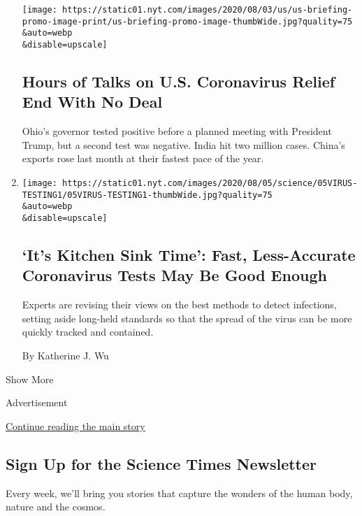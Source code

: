 \begin{enumerate}
  \texttt{[image: https://static01.nyt.com/images/2020/08/03/us/us-briefing-promo-image-print/us-briefing-promo-image-thumbWide.jpg?quality=75\\\&auto=webp\\\&disable=upscale]}

  \hypertarget{hours-of-talks-on-us-coronavirus-relief-end-with-no-deal}{%
  \subsection{Hours of Talks on U.S. Coronavirus Relief End With No
  Deal}\label{hours-of-talks-on-us-coronavirus-relief-end-with-no-deal}}

  Ohio's governor tested positive before a planned meeting with
  President Trump, but a second test was negative. India hit two million
  cases. China's exports rose last month at their fastest pace of the
  year.
\item
  \href{/2020/08/06/health/rapid-Covid-tests.html}{}

  \texttt{[image: https://static01.nyt.com/images/2020/08/05/science/05VIRUS-TESTING1/05VIRUS-TESTING1-thumbWide.jpg?quality=75\\\&auto=webp\\\&disable=upscale]}

  \hypertarget{its-kitchen-sink-time-fast-less-accurate-coronavirus-tests-may-be-good-enough}{%
  \subsection{`It's Kitchen Sink Time': Fast, Less-Accurate Coronavirus
  Tests May Be Good
  Enough}\label{its-kitchen-sink-time-fast-less-accurate-coronavirus-tests-may-be-good-enough}}

  Experts are revising their views on the best methods to detect
  infections, setting aside long-held standards so that the spread of
  the virus can be more quickly tracked and contained.

  By Katherine J. Wu
\end{enumerate}

Show More

Advertisement

\protect\hyperlink{after-mid2}{Continue reading the main story}

\hypertarget{sign-up-for-the-science-times-newsletter}{%
\subsection{Sign Up for the Science Times
Newsletter}\label{sign-up-for-the-science-times-newsletter}}

Every week, we'll bring you stories that capture the wonders of the
human body, nature and the cosmos.

